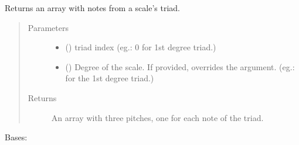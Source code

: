 \documentclass[letterpaper,10pt,english]{sphinxmanual}
\begin{document}
\begin{fulllineitems}
\begin{fulllineitems}
\begin{quote}
\begin{description}
\begin{itemize}
\end{itemize}

\end{description}\end{quote}

\end{fulllineitems}


\begin{fulllineitems}
\label{\detokenize{birdears:birdears.scale.DiatonicScale.get_triad}}
\sphinxAtStartPar
Returns an array with notes from a scale’s triad.
\begin{quote}\begin{description}
\item[{Parameters}] \leavevmode\begin{itemize}
\item {} 
\sphinxAtStartPar
{} () \textendash{} triad index (eg.: 0 for 1st degree triad.)

\item {} 
\sphinxAtStartPar
{} () \textendash{} Degree of the scale. If provided, overrides the
 argument. (eg.:  for the 1st degree triad.)

\end{itemize}

\item[{Returns}] \leavevmode
\sphinxAtStartPar
An array with three pitches, one for each note of the triad.

\end{description}\end{quote}

\end{fulllineitems}


\end{fulllineitems}


\begin{fulllineitems}
\label{\detokenize{birdears:birdears.scale.ScaleBase}}
\sphinxAtStartPar
Bases: 

\end{fulllineitems}
\end{document}

